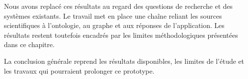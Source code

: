 Nous avons replacé ces résultats au regard des questions de recherche et des systèmes existants. Le travail met en place une chaîne reliant les sources scientifiques à l'ontologie, au graphe et aux réponses de l'application. Les résultats restent toutefois encadrés par les limites méthodologiques présentées dans ce chapitre.

La conclusion générale reprend les résultats disponibles, les limites de l'étude et les travaux qui pourraient prolonger ce prototype.
